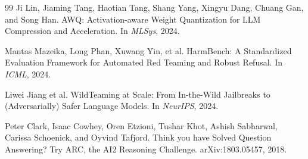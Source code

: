 \documentclass[11pt]{article}
\begin{document}
\begin{thebibliography}{99}
Ji Lin, Jiaming Tang, Haotian Tang, Shang Yang, Xingyu Dang, Chuang Gan, and Song Han.
\newblock AWQ: Activation-aware Weight Quantization for LLM Compression and Acceleration.
\newblock In \emph{MLSys}, 2024.

Mantas Mazeika, Long Phan, Xuwang Yin, et al.
\newblock HarmBench: A Standardized Evaluation Framework for Automated Red Teaming and Robust Refusal.
\newblock In \emph{ICML}, 2024.

Liwei Jiang et al.
\newblock WildTeaming at Scale: From In-the-Wild Jailbreaks to (Adversarially) Safer Language Models.
\newblock In \emph{NeurIPS}, 2024.

Peter Clark, Isaac Cowhey, Oren Etzioni, Tushar Khot, Ashish Sabharwal, Carissa Schoenick, and Oyvind Tafjord.
\newblock Think you have Solved Question Answering? Try ARC, the AI2 Reasoning Challenge.
\newblock arXiv:1803.05457, 2018.

\end{thebibliography}
\end{document}
